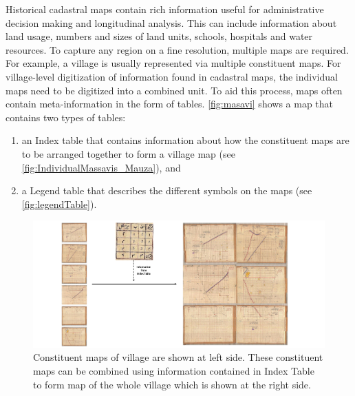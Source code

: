 Historical cadastral maps contain rich information useful for administrative decision making and longitudinal analysis. This can include information about land usage, numbers and sizes of land units, schools, hospitals and water resources. To capture any region on a fine resolution, multiple maps are required. For example, a village is usually represented via multiple constituent maps. For village-level digitization of information found in cadastral maps, the individual maps need to be digitized into a combined unit. To aid this process, maps often contain meta-information in the form of tables. \autoref{fig:masavi} shows a map that contains two types of tables:
\begin{enumerate}
\item an Index table that contains information about how the constituent maps are to be arranged together to form a village map (see \autoref{fig:IndividualMassavis_Mauza}), and
\item a Legend table that describes the different symbols on the maps (see \autoref{fig:legendTable}).
\end{enumerate}
\begin{figure}[h!]
    \centering
    \includegraphics[width=\linewidth,keepaspectratio]{individualMassavis_IndexTable_Mauza.pdf}
    \caption{Constituent maps of village are shown at left side. These constituent maps can be combined using information contained in Index Table to form map of the whole village which is shown at the right side.}
    \label{fig:IndividualMassavis_Mauza}
\end{figure}
